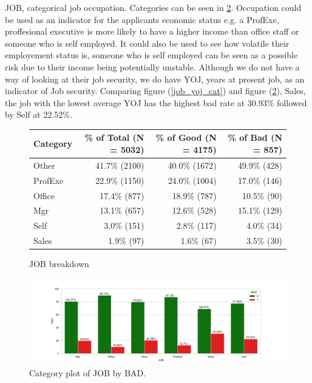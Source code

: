 JOB, categorical job occupation. Categories can be seen in \ref{job_cat}. Occupation could be used as an indicator for the applicants economic status e.g. a ProfExe, proffesional executive is more likely to have a higher income than office staff or someone who is self employed. It could also be used to see how volatile their employement status is, someone who is self employed can be seen as a possible risk due to their income being potentially unstable. Although we do not have a way of looking at their job security, we do have YOJ, years at present job, as an indicator of Job security. Comparing figure (\ref{job_yoj_cat}) and figure (\ref{job_cat}), Sales, the job with the lowest average YOJ has the highest bad rate at 30.93\% followed by Self at 22.52\%. 

\begin{figure}[ht]
	\centering
	\renewcommand{\arraystretch}{2}
	\begin{tabular}{lrrr}
		\toprule
		Category & \% of Total (N = 5032) & \% of Good (N = 4175) & \% of Bad (N = 857) \\
		\midrule
		Other & 41.7\% (2100) & 40.0\% (1672) &  49.9\% (428)  \\
		ProfExe & 22.9\% (1150) & 24.0\% (1004) &  17.0\% (146)  \\
		Office & 17.4\% (877) & 18.9\% (787) &  10.5\% (90)  \\
		Mgr &  13.1\% (657) & 12.6\% (528) & 15.1\% (129)  \\
		Self & 3.0\% (151) & 2.8\% (117) &  4.0\% (34)  \\
		Sales & 1.9\% (97) & 1.6\% (67) &  3.5\% (30)  \\
		\bottomrule
	\end{tabular}
	\caption{JOB breakdown \label{job_count_tbl}}
\end{figure}

\begin{figure}[!ht]
	\centering
	\includegraphics[scale=0.40]{figs/job_cat.pdf}
	\caption{Category plot of JOB by BAD. \label{job_cat}}
\end{figure}

